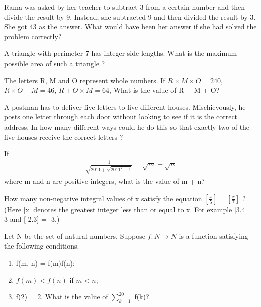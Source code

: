\item Rama was asked by her teacher to subtract 3 from a certain number and then divide the result by 9. Instead, she subtracted 9 and then divided the result by 3. She got 43 as the answer. What would have been her answer if she had solved the problem correctly?

\item A triangle with perimeter 7 has integer side lengths. What is the maximum possible area of such a triangle ?

\item The letters R, M and O represent whole numbers. If $R \times M \times O = 240$, $R \times O + M = 46$, 
$R + O \times M = 64$, What is the value of R + M + O?

\item A postman has to deliver five letters to five different houses. Mischievously, he posts one letter through each door without looking to see if it is the correct address. In how many different ways could he do this so that exactly two of the five houses receive the correct letters ?

\item If 
\begin{align*}
\frac{1}{\sqrt{2011 + \sqrt{2011^2 - 1}}} = \sqrt{m} - \sqrt{n}
\end{align*}
where m and n are positive integers, what is the value of m + n?

\item How many non-negative integral values of x satisfy the equation $[\frac{x}{5}] = [\frac{x}{7}]$ ? (Here [x] denotes the greatest integer less than or equal to x. For example [3.4] = 3 and [-2.3] = -3.)

\item Let N be the set of natural numbers. Suppose $f: N \to {N}$ is a function satisfying the following conditions.
\begin{enumerate}
\item f(m, n) = f(m)f(n);
\item $f(m) < f(n)$ if $m < n$;
\item f(2) = 2. What is the value of $\sum_{k = 1}^{20}$ f(k)?
\end{enumerate}
